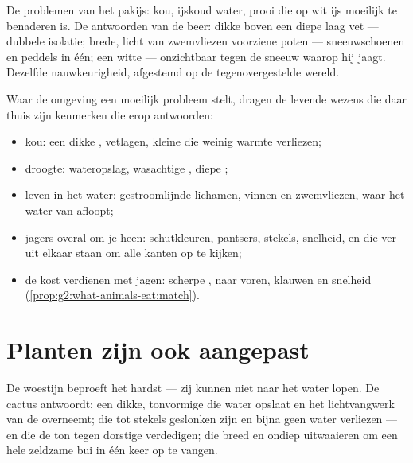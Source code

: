 \begin{example}\label{ex:g4:adapted-to-their-world:bear}
De problemen van het pakijs: kou, ijskoud water, prooi die op wit ijs
moeilijk te benaderen is. De antwoorden van de beer: dikke  boven
een diepe laag vet --- dubbele isolatie; brede, licht van zwemvliezen
voorziene poten --- sneeuwschoenen en peddels in één; een witte  ---
onzichtbaar tegen de sneeuw waarop hij jaagt. Dezelfde nauwkeurigheid,
afgestemd op de tegenovergestelde wereld.
\end{example}

\begin{proposition}\label{prop:g4:adapted-to-their-world:answers}
Waar de omgeving een moeilijk probleem stelt, dragen de levende wezens
die daar thuis zijn kenmerken die erop antwoorden:
\begin{itemize}
  \item kou: een dikke , vetlagen, kleine  die weinig warmte
        verliezen;
  \item droogte: wateropslag, wasachtige , diepe ;
  \item leven in het water: gestroomlijnde lichamen, vinnen en
        zwemvliezen,  waar het water van afloopt;
  \item jagers overal om je heen: schutkleuren, pantsers, stekels,
        snelheid, en  die ver uit elkaar staan om alle kanten op te
        kijken;
  \item de kost verdienen met jagen: scherpe ,  naar voren,
        klauwen en snelheid
        (\cref{prop:g2:what-animals-eat:match}).
\end{itemize}
\end{proposition}
\admitted

\section{Planten zijn ook aangepast}

\begin{example}[De cactus]\label{ex:g4:adapted-to-their-world:cactus}
De woestijn beproeft  het hardst --- zij kunnen niet naar het
water lopen. De cactus antwoordt: een dikke, tonvormige  die
water opslaat en het lichtvangwerk van de  overneemt; 
die tot stekels geslonken zijn en bijna geen water verliezen --- en die
de ton tegen dorstige  verdedigen;  die breed en ondiep
uitwaaieren om een hele zeldzame bui in één keer op te vangen.
\end{example}

